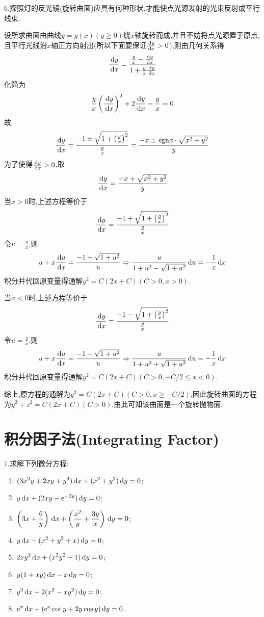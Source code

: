 6.探照灯的反光镜(旋转曲面)应具有何种形状,才能使点光源发射的光束反射成平行线束.

\begin{solve}
设所求曲面由曲线$y=y(x)(y\geq0)$绕$x$轴旋转而成,并且不妨将点光源置于原点,
且平行光线沿$x$轴正方向射出(所以下面要保证$\frac{\,\mathrm{d} y}{\,\mathrm{d} x}>0$),则由几何关系得
\[\frac{\,\mathrm{d} y}{\,\mathrm{d} x}=\frac{\frac{y}{x}-\frac{\,\mathrm{d} y}{\,\mathrm{d} x}}{1+\frac{y}{x}\frac{\,\mathrm{d} y}{\,\mathrm{d} x}}\]
化简为
\[\frac{y}{x}\left(\frac{\,\mathrm{d} y}{\,\mathrm{d} x}\right)^2+2\frac{\,\mathrm{d} y}{\,\mathrm{d} x}-\frac{y}{x}=0\]
故
\[\frac{\,\mathrm{d} y}{\,\mathrm{d} x}=\frac{-1\pm\sqrt{1+\left(\frac{y}{x}\right)^2}}{\frac{y}{x}}=\frac{-x\pm\,\mathrm{sgn} x\cdot\sqrt{x^2+y^2}}{y}\]
为了使得$\frac{\,\mathrm{d} y}{\,\mathrm{d} x}>0$,取
\[\frac{\,\mathrm{d} y}{\,\mathrm{d} x}=\frac{-x+\sqrt{x^2+y^2}}{y}\]
当$x>0$时,上述方程等价于
\[\frac{\,\mathrm{d} y}{\,\mathrm{d} x}=\frac{-1+\sqrt{1+\left(\frac{y}{x}\right)^2}}{\frac{y}{x}}\]
令$u=\frac{y}{x}$,则
\[u+x\frac{\,\mathrm{d} u}{\,\mathrm{d} x}=\frac{-1+\sqrt{1+u^2}}{u}\Rightarrow\frac{u}{1+u^2-\sqrt{1+u^2}}\,\mathrm{d} u=-\frac{1}{x}\,\mathrm{d} x\]
积分并代回原变量得通解$y^2=C(2x+C)(C>0,x>0)$.

当$x<0$时,上述方程等价于
\[\frac{\,\mathrm{d} y}{\,\mathrm{d} x}=\frac{-1-\sqrt{1+\left(\frac{y}{x}\right)^2}}{\frac{y}{x}}\]
令$u=\frac{y}{x}$,则
\[u+x\frac{\,\mathrm{d} u}{\,\mathrm{d} x}=\frac{-1-\sqrt{1+u^2}}{u}\Rightarrow\frac{u}{1+u^2+\sqrt{1+u^2}}\,\mathrm{d} u=-\frac{1}{x}\,\mathrm{d} x\]
积分并代回原变量得通解$y^2=C(2x+C)(C>0,-C/2\leq x<0)$.

综上,原方程的通解为$y^2=C(2x+C)(C>0,x\geq-C/2)$,因此旋转曲面的方程为$y^2+z^2=C(2x+C)(C>0)$,由此可知该曲面是一个旋转抛物面.
\end{solve}

\section{积分因子法(Integrating Factor)}
1.求解下列微分方程:
\begin{enumerate}[(1)]
\item $\displaystyle(3x^2y+2xy+y^3)\,\mathrm{d} x+(x^2+y^2)\,\mathrm{d} y=0$;
\item $\displaystyle y\,\mathrm{d} x+(2xy-\mathrm{e}^{-2y})\,\mathrm{d} y=0$;
\item $\displaystyle\left(3x+\frac{6}{y}\right)\,\mathrm{d} x+\left(\frac{x^2}{y}+\frac{3y}{x}\right)\,\mathrm{d} y=0$;
\item $\displaystyle y\,\mathrm{d} x-(x^2+y^2+x)\,\mathrm{d} y=0$;
\item $\displaystyle 2xy^3\,\mathrm{d} x+(x^2y^2-1)\,\mathrm{d} y=0$;
\item $\displaystyle y(1+xy)\,\mathrm{d} x-x\,\mathrm{d} y=0$;
\item $\displaystyle y^3\,\mathrm{d} x+2(x^2-xy^2)\,\mathrm{d} y=0$;
\item $\displaystyle\mathrm{e}^x\,\mathrm{d} x+(\mathrm{e}^x\cot y+2y\cos y)\,\mathrm{d} y=0$.
\end{enumerate}

